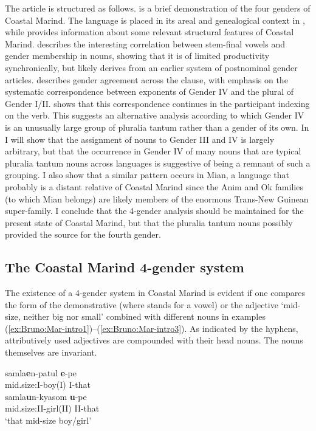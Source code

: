 \documentclass[output=collectionpaper]{langsci/langscibook}
\begin{document}
The article is structured as follows.  is a brief demonstration of the four genders of Coastal Marind. The language is placed in its areal and genealogical context in , while  provides information about some relevant structural features of Coastal Marind.
%
 describes the interesting correlation between stem-final vowels and gender membership in nouns, showing that it is of limited productivity synchronically, but likely derives from an earlier system of postnominal gender articles.
%
 describes gender agreement across the clause, with emphasis on the systematic correspondence between exponents of Gender IV and the plural of Gender I/II.
%
 shows that this correspondence continues in the participant indexing on the verb. This suggests an alternative analysis according to which Gender IV is an unusually large group of pluralia tantum rather than a gender of its own.
%
In  I will show that the assignment of nouns to Gender III and IV is largely arbitrary, but that the occurrence in Gender IV of many nouns that are typical pluralia tantum nouns across languages is suggestive of being a remnant of such a grouping. I also show that a similar pattern occurs in Mian, a language that probably is a distant relative of Coastal Marind since the Anim and Ok families (to which Mian belongs) are likely members of the enormous Trans-New Guinean super-family. I conclude that the 4-gender analysis should be maintained for the present state of Coastal Marind, but that the pluralia tantum nouns possibly provided the source for the fourth gender.

\subsection{The Coastal Marind 4-gender system}\label{sec:Bruno:MarGndr}
The existence of a 4-gender system in Coastal Marind is evident if one compares the form of the demonstrative  (where  stands for a vowel) or the adjective  `mid-size, neither big nor small' combined with different nouns in examples (\ref{ex:Bruno:Mar-intro1})--(\ref{ex:Bruno:Mar-intro3}). As indicated by the hyphens, attributively used adjectives are compounded with their head nouns. The nouns themselves are invariant.


\ea\label{ex:Bruno:Mar-intro1}
\begin{xlist}
\ex
\gll samla\GH\textbf{e}n-patul \textbf{e}-pe\\
mid.size:I-boy(I) I-that\\
\ex
\gll samla\GH\textbf{u}n-kyasom \textbf{u}-pe\\
mid.size:II-girl(II) II-that\\
\glt `that mid-size boy/girl'
\end{xlist}
\z
\end{document}
